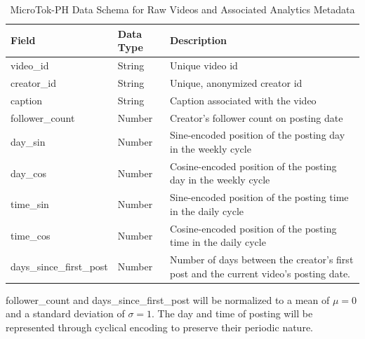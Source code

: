 \begin{table}[H]
    \centering
    \begin{tabular}{llp{8cm}}
        \toprule
        \textbf{Field}  & \textbf{Data Type} & \textbf{Description} \\
        \midrule
        video\_id  & String & Unique video id \\
        creator\_id  & String & Unique, anonymized creator id \\
        caption & String & Caption associated with the video \\
        follower\_count & Number & Creator's follower count on posting date \\
        day\_sin & Number & Sine-encoded position of the posting day in the weekly cycle \\
        day\_cos & Number & Cosine-encoded position of the posting day in the weekly cycle \\
        time\_sin & Number & Sine-encoded position of the posting time in the daily cycle \\
        time\_cos & Number & Cosine-encoded position of the posting time in the daily cycle \\
        days\_since\_first\_post & Number & Number of days between the creator's first post and the current video's posting date. \\
        \bottomrule
    \end{tabular}
    \caption{MicroTok-PH Data Schema for Raw Videos and Associated Analytics Metadata}
    \label{tab:schema}
\end{table}

follower\_count and days\_since\_first\_post will be normalized to a mean of $\mu=0$ and a standard deviation of $\sigma=1$. The day and time of posting will be represented through cyclical encoding to preserve their periodic nature. 




